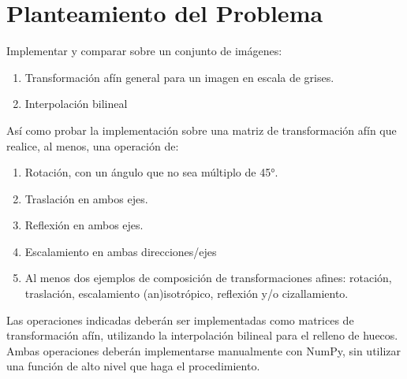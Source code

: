 \section{Planteamiento del Problema}
    Implementar y comparar sobre un conjunto de imágenes:
    \begin{enumerate}
        \item Transformación afín general para un imagen en escala de grises.
        \item Interpolación bilineal
    \end{enumerate}

    Así como probar la implementación sobre una matriz de transformación afín que realice, al menos, una operación de: 
    \begin{enumerate}
        \item Rotación, con un ángulo que no sea múltiplo de 45°.
        \item Traslación en ambos ejes.
        \item Reflexión en ambos ejes.
        \item Escalamiento en ambas direcciones/ejes
        \item Al menos dos ejemplos de composición de transformaciones afines: rotación, traslación, escalamiento (an)isotrópico, reflexión y/o cizallamiento.
    \end{enumerate}

    Las operaciones indicadas deberán ser implementadas como matrices de transformación afín, utilizando la interpolación bilineal para el relleno de huecos.\\

    Ambas operaciones deberán implementarse manualmente con NumPy, sin utilizar una función de alto nivel que haga el procedimiento.